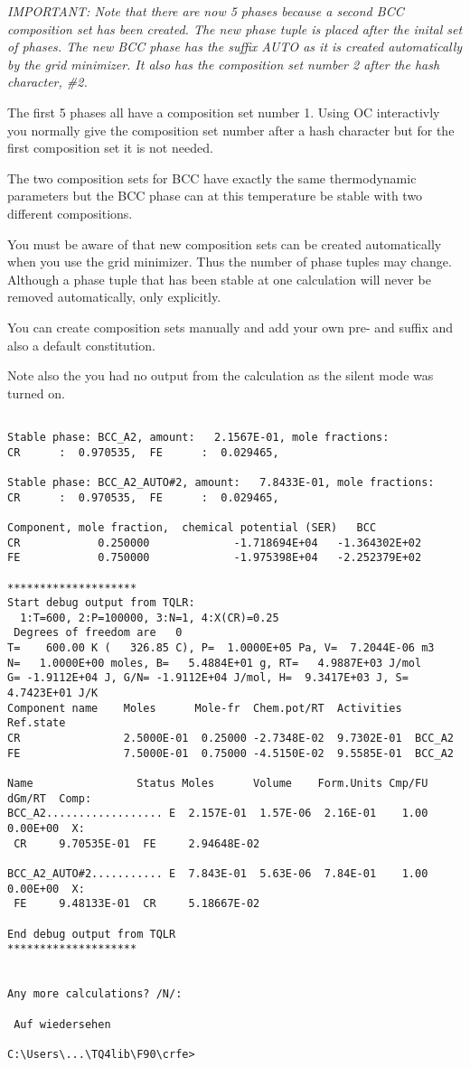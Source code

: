 \documentclass[12pt]{article}
\begin{document}
{\em IMPORTANT: Note that there are now 5 phases because a second BCC
  composition set has been created.  The new phase tuple is placed
  after the inital set of phases.  The new BCC phase has the suffix
  AUTO as it is created automatically by the grid minimizer.  It also
  has the composition set number 2 after the hash character, \#2.

  The first 5 phases all have a composition set number 1.  Using OC
  interactivly you normally give the composition set number after a
  hash character but for the first composition set it is not needed.

  The two composition sets for BCC have exactly the same thermodynamic
  parameters but the BCC phase can at this temperature be stable with
  two different compositions.

  You must be aware of that new composition sets can be created
  automatically when you use the grid minimizer.  Thus the number of
  phase tuples may change.  Although a phase tuple that has been stable
  at one calculation will never be removed automatically, only explicitly.

  You can create composition sets manually and add your own pre- and
  suffix and also a default constitution.

  Note also the you had no output from the calculation as the silent
  mode was turned on.}

{\small
\begin{verbatim}

Stable phase: BCC_A2, amount:   2.1567E-01, mole fractions:
CR      :  0.970535,  FE      :  0.029465,

Stable phase: BCC_A2_AUTO#2, amount:   7.8433E-01, mole fractions:
CR      :  0.970535,  FE      :  0.029465,

Component, mole fraction,  chemical potential (SER)   BCC
CR            0.250000             -1.718694E+04   -1.364302E+02
FE            0.750000             -1.975398E+04   -2.252379E+02

********************
Start debug output from TQLR:
  1:T=600, 2:P=100000, 3:N=1, 4:X(CR)=0.25
 Degrees of freedom are   0
T=    600.00 K (   326.85 C), P=  1.0000E+05 Pa, V=  7.2044E-06 m3
N=   1.0000E+00 moles, B=   5.4884E+01 g, RT=   4.9887E+03 J/mol
G= -1.9112E+04 J, G/N= -1.9112E+04 J/mol, H=  9.3417E+03 J, S=  4.7423E+01 J/K
Component name    Moles      Mole-fr  Chem.pot/RT  Activities  Ref.state
CR                2.5000E-01  0.25000 -2.7348E-02  9.7302E-01  BCC_A2
FE                7.5000E-01  0.75000 -4.5150E-02  9.5585E-01  BCC_A2

Name                Status Moles      Volume    Form.Units Cmp/FU dGm/RT  Comp:
BCC_A2.................. E  2.157E-01  1.57E-06  2.16E-01    1.00  0.00E+00  X:
 CR     9.70535E-01  FE     2.94648E-02

BCC_A2_AUTO#2........... E  7.843E-01  5.63E-06  7.84E-01    1.00  0.00E+00  X:
 FE     9.48133E-01  CR     5.18667E-02

End debug output from TQLR
********************


Any more calculations? /N/:

 Auf wiedersehen

C:\Users\...\TQ4lib\F90\crfe>
\end{verbatim}
}
\end{document}

